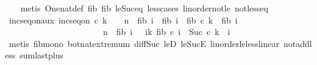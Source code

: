 \begin{isabellebody}
%
\isadelimproof
\ \ %
\endisadelimproof
%
\isatagproof
{}\isamarkupfalse%
\ {\isacharparenleft}{\kern0pt}metis\ One{\isacharunderscore}{\kern0pt}nat{\isacharunderscore}{\kern0pt}def\ fib{\isacharunderscore}{\kern0pt}{}\ fib{\isacharunderscore}{\kern0pt}{}\ le{\isacharunderscore}{\kern0pt}Suc{\isacharunderscore}{\kern0pt}eq\ less{\isacharunderscore}{\kern0pt}{}{\isacharunderscore}{\kern0pt}cases\ linorder{\isacharunderscore}{\kern0pt}not{\isacharunderscore}{\kern0pt}le\ not{\isacharunderscore}{\kern0pt}less{\isacharunderscore}{\kern0pt}eq{\isacharparenright}{\kern0pt}%
\endisatagproof
{\isafoldproof}%
%
\isadelimproof
\isanewline
%
\endisadelimproof
\isanewline
{}\isamarkupfalse%
\ inc{\isacharunderscore}{\kern0pt}seq{\isacharunderscore}{\kern0pt}on{\isacharunderscore}{\kern0pt}aux{\isacharcolon}{\kern0pt}\ {\isachardoublequoteopen}inc{\isacharunderscore}{\kern0pt}seq{\isacharunderscore}{\kern0pt}on\ c\ {\isacharbraceleft}{\kern0pt}{}{\isachardot}{\kern0pt}{\isachardot}{\kern0pt}k\ {\isacharminus}{\kern0pt}\ {}{\isacharbraceright}{\kern0pt}\ {\isasymLongrightarrow}\ n\ {\isacharminus}{\kern0pt}\ fib\ i\ {\isacharless}{\kern0pt}\ fib\ {\isacharparenleft}{\kern0pt}i{\isacharminus}{\kern0pt}{}{\isacharparenright}{\kern0pt}\ {\isasymLongrightarrow}\ fib\ {\isacharparenleft}{\kern0pt}c\ k{\isacharparenright}{\kern0pt}\ {\isacharless}{\kern0pt}\ fib\ i\ {\isasymLongrightarrow}\ \isanewline
\ \ \ \ \ \ \ \ \ \ \ \ \ \ \ \ \ \ \ \ \ \ \ {\isacharparenleft}{\kern0pt}n\ {\isacharminus}{\kern0pt}\ fib\ i{\isacharparenright}{\kern0pt}\ {\isacharequal}{\kern0pt}\ {\isacharparenleft}{\kern0pt}{\isasymSum}\ i{\isacharequal}{\kern0pt}{}{\isachardot}{\kern0pt}{\isachardot}{\kern0pt}k{\isachardot}{\kern0pt}\ fib\ {\isacharparenleft}{\kern0pt}c\ i{\isacharparenright}{\kern0pt}{\isacharparenright}{\kern0pt}\ {\isasymLongrightarrow}\ Suc\ {\isacharparenleft}{\kern0pt}c\ k{\isacharparenright}{\kern0pt}\ {\isacharless}{\kern0pt}\ i{\isachardoublequoteclose}\isanewline
%
\isadelimproof
\ \ %
\endisadelimproof
%
\isatagproof
{}\isamarkupfalse%
\ {\isacharparenleft}{\kern0pt}metis\ fib{\isacharunderscore}{\kern0pt}mono\ bot{\isacharunderscore}{\kern0pt}nat{\isacharunderscore}{\kern0pt}{}{\isachardot}{\kern0pt}extremum\ diff{\isacharunderscore}{\kern0pt}Suc{\isacharunderscore}{\kern0pt}{}\ leD\ le{\isacharunderscore}{\kern0pt}SucE\ linorder{\isacharunderscore}{\kern0pt}le{\isacharunderscore}{\kern0pt}less{\isacharunderscore}{\kern0pt}linear\ not{\isacharunderscore}{\kern0pt}add{\isacharunderscore}{\kern0pt}less{}\ sum{\isachardot}{\kern0pt}last{\isacharunderscore}{\kern0pt}plus{\isacharparenright}{\kern0pt}%

\end{isabellebody}
